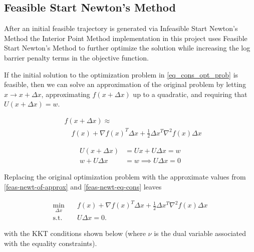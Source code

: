 \documentclass{exam}
\begin{document}
\begin{multicols}{2}
\subsection{Feasible Start Newton's Method}

After an initial feasible trajectory is generated via Infeasible Start Newton's Method the Interior Point Method implementation in this project uses Feasible Start Newton's Method to further optimize the solution while increasing the log barrier penalty terms in the objective function.

If the initial solution to the optimization problem in \eqref{eq_cons_opt_prob} is feasible, then we can solve an approximation of the original problem by letting $x \rightarrow x + \Delta x$, approximating $f(x + \Delta x)$ up to a quadratic, and requiring that $U(x + \Delta x) = w$.

\begin{equation}
    \label{feas-newt-of-approx}
    \begin{aligned}
        &f(x + \Delta x) \approx \\
        &\quad f(x) + \nabla f(x)^T \Delta x + \frac{1}{2}\Delta x^T \nabla^2f(x) \Delta x
    \end{aligned}
\end{equation}

\begin{equation}
    \label{feas-newt-eq-cons}
    \begin{aligned}
        U(x + \Delta x) &= Ux + U \Delta x = w \\
        w + U \Delta x &= w \implies U \Delta x = 0
    \end{aligned}
\end{equation}

Replacing the original optimization problem with the approximate values from \eqref{feas-newt-of-approx} and \eqref{feas-newt-eq-cons} leaves

\begin{equation}
    \label{feas-newt-approx-eq-cons-opt-prob}
    \begin{aligned}
        \min_{\Delta x} \quad & f(x) + \nabla f(x)^T \Delta x + \frac{1}{2}\Delta x^T \nabla^2f(x) \Delta x \\
        \textrm{s.t.} \quad & U\Delta x = 0.
    \end{aligned}
\end{equation}

with the KKT conditions shown below (where $\nu$ is the dual variable associated with the equality constraints).


\end{multicols}
\end{document}

